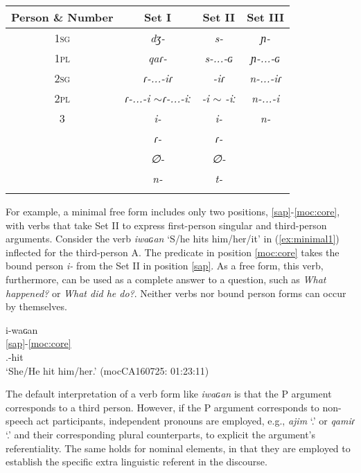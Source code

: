 \documentclass[output=paper]{langscibook}
\begin{document}
\begin{table}
\label{tab:bound person forms paradigmsI}
\begin{tabular}{cccc}
\lsptoprule
\textbf{Person \& Number} &  \textbf{Set I }&   \textbf{Set II} & \textbf{Set III }         \\\midrule
\textsc{1sg} &   \textit{dʒ-} &  \textit{s-} & \textit{ɲ-}\\
\textsc{1pl} &   \textit{qaɾ-} & \textit{s-...-ɢ}& \textit{ɲ-...-ɢ}\\
\textsc{2sg} &\textit{ɾ-...-iɾ} &\textit{-iɾ} & \textit{n-...-iɾ}\\
\textsc{2pl} &  \textit{ɾ-...-i} $\sim$\textit{ɾ-...-iː} &  \textit{-i} $\sim$ \textit{-iː} & \textit{n-...-i} \\
\textsc{3} & \textit{i-} & \textit{i-} &\textit{n-} \\
 & \textit{ɾ-} &  \textit{ɾ-} &\\
 & \textit{∅-} &   \textit{∅-} &\\
  & \textit{n-}&  \textit{t-} &\\
\lspbottomrule
\end{tabular}
\end{table}


For example, a minimal free form includes only two positions, \ref{sap}-\ref{moc:core}, with verbs that take Set II to express first-person singular and third-person arguments. Consider the verb \textit{iwaɢan} `S/he hits him/her/it' in (\ref{ex:minimal1}) inflected for the third-person A. The predicate in position \ref{moc:core} takes the bound person \textit{i-} from the Set II in position \ref{sap}. As a free form, this verb, furthermore, can be used as a complete answer to a question, such as \textit{What happened?} or \textit{What did he do?}. Neither verbs nor bound person forms can occur by themselves. 

\ea \label{ex:minimal1}
\ea 
	\glll i-waɢan \\
	      \ref{sap}-\ref{moc:core}\\               
	  {\Third.\II}-hit  \\
	\glt `She/He hit him/her.' \hfill (mocCA160725: 01:23:11)
\z
\z

The default interpretation of a verb form like \textit{iwaɢan} is that the P argument corresponds to a third person. However, if the P argument corresponds to non-speech act participants, independent pronouns are employed, e.g., \textit{ajim} \textsc{`\First\Sg.\Pron'} or \textit{qamiɾ} \textsc{`\Second\Sg.\Pron'} and their corresponding plural counterparts, to explicit the argument's referentiality. The same holds for nominal elements, in that they are employed to establish  the specific extra linguistic referent in the discourse. 
\end{document}

